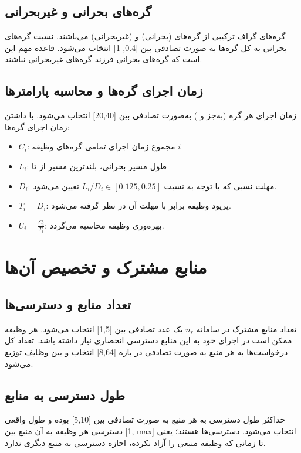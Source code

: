 \documentclass[12pt,a4paper]{report}
\begin{document}
\section{گره‌های بحرانی و غیربحرانی}
گره‌های گراف ترکیبی از گره‌های  (بحرانی) و  (غیربحرانی) می‌باشند. نسبت گره‌های بحرانی به کل گره‌ها به صورت تصادفی بین [0.4, 1] انتخاب می‌شود. قاعده مهم این است که گره‌های بحرانی فرزند گره‌های غیربحرانی نباشند.

\section{زمان اجرای گره‌ها و محاسبه پارامترها}
زمان اجرای هر گره (به‌جز  و ) به‌صورت تصادفی بین [20,40] انتخاب می‌شود. با داشتن زمان اجرای گره‌ها:
\begin{itemize}
\item $C_i$: مجموع زمان اجرای تمامی گره‌های وظیفه $i$
\item $L_i$: طول مسیر بحرانی، بلندترین مسیر از  تا 
\item $D_i$: مهلت نسبی که با توجه به نسبت $L_i / D_i \in [0.125,0.25]$ تعیین می‌شود.
\item $T_i = D_i$: پریود وظیفه برابر با مهلت آن در نظر گرفته می‌شود.
\item $U_i = \frac{C_i}{T_i}$: بهره‌وری وظیفه محاسبه می‌گردد.
\end{itemize}

\chapter{منابع مشترک و تخصیص آن‌ها}
\section{تعداد منابع و دسترسی‌ها}
تعداد منابع مشترک در سامانه $n_r$ یک عدد تصادفی بین [1,5] انتخاب می‌شود. هر وظیفه ممکن است در اجرای خود به این منابع دسترسی انحصاری نیاز داشته باشد. تعداد کل درخواست‌ها به هر منبع به صورت تصادفی در بازه [8,64] انتخاب و بین وظایف توزیع می‌شود.

\section{طول دسترسی به منابع}
حداکثر طول دسترسی به هر منبع به صورت تصادفی بین [5,10] بوده و طول واقعی دسترسی هر وظیفه به آن منبع بین [1, max] انتخاب می‌شود. دسترسی‌ها  هستند؛ یعنی تا زمانی که وظیفه منبعی را آزاد نکرده، اجازه دسترسی به منبع دیگری ندارد.
\end{document}
